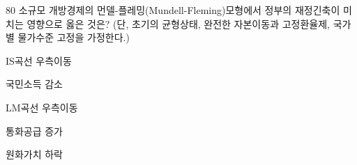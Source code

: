 \begin{question}{80}
소규모 개방경제의 먼델-플레밍(Mundell-Fleming)모형에서 정부의 재정긴축이 미치는 영향으로 옳은 것은? (단, 초기의 균형상태, 완전한 자본이동과 고정환율제, 국가별 물가수준 고정을 가정한다.)
\begin{choices}
  \item IS곡선 우측이동
  \item 국민소득 감소
  \item LM곡선 우측이동
  \item 통화공급 증가
  \item 원화가치 하락
\end{choices}
\end{question}
